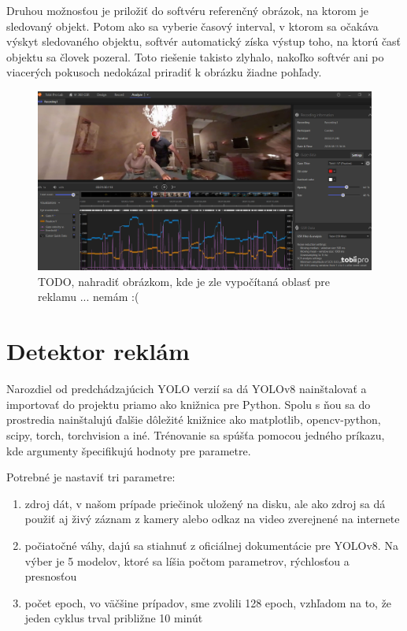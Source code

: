 Druhou možnosťou je priložiť do softvéru referenčný obrázok, na ktorom je sledovaný objekt. Potom ako sa vyberie časový interval, v ktorom sa očakáva výskyt sledovaného objektu, softvér automatický získa výstup toho, na ktorú časť objektu sa človek pozeral. Toto riešenie takisto zlyhalo, nakoľko softvér ani po viacerých pokusoch nedokázal priradiť k obrázku žiadne pohľady.
\\
\begin{figure}[ht]
    \centering
    \includegraphics[width=1\textwidth]{images/04/tobiiprolab3.jpg}
    \caption{TODO, nahradiť obrázkom, kde je zle vypočítaná oblasť pre reklamu ... nemám :(}
    \label{img:lab}
\end{figure}


\section{Detektor reklám}

Narozdiel od predchádzajúcich YOLO verzií sa dá YOLOv8 nainštalovať a importovať do projektu priamo ako knižnica pre Python. Spolu s ňou sa do prostredia nainštalujú ďalšie dôležité knižnice ako matplotlib, opencv-python, scipy, torch, torchvision a iné. Trénovanie sa spúšťa pomocou jedného príkazu, kde argumenty špecifikujú hodnoty pre parametre.

Potrebné je nastaviť tri parametre:

\begin{enumerate}
    \item zdroj dát,  v našom prípade priečinok uložený na disku, ale ako zdroj sa dá použiť aj živý záznam z kamery alebo odkaz na video zverejnené na internete
    \item počiatočné váhy,  dajú sa stiahnuť z oficiálnej dokumentácie pre YOLOv8. Na výber je 5 modelov, ktoré sa líšia počtom parametrov, rýchlosťou a presnosťou
    \item počet epoch, vo väčšine prípadov, sme zvolili 128 epoch, vzhľadom na to, že jeden cyklus trval približne 10 minút
\end{enumerate}

